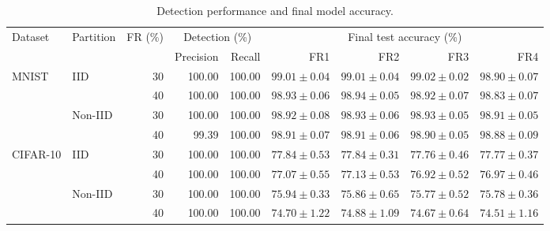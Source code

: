 \begin{table}[!t]
\centering\footnotesize\setlength{\tabcolsep}{3.5pt}
\caption{Detection performance and final model accuracy.}\label{tab:performance}
\begin{tabular}{llrrrrrrr}
\toprule
\multirow{2}{*}{Dataset} & \multirow{2}{*}{Partition} & \multirow{2}{*}{FR (\%)} & \multicolumn{2}{c}{Detection (\%)} & \multicolumn{4}{c}{Final test accuracy (\%)} \\
\cmidrule(lr){4-5}\cmidrule(lr){6-9}
& & & Precision & Recall & FR1 & FR2 & FR3 & FR4 \\
\midrule
\multirow{4}{*}{MNIST} & \multirow{2}{*}{IID} & 30 & 100.00 & 100.00 & $99.01 \pm 0.04$ & $99.01 \pm 0.04$ & $99.02 \pm 0.02$ & $98.90 \pm 0.07$ \\
 &  & 40 & 100.00 & 100.00 & $98.93 \pm 0.06$ & $98.94 \pm 0.05$ & $98.92 \pm 0.07$ & $98.83 \pm 0.07$ \\
\cmidrule(lr){2-9}
 & \multirow{2}{*}{Non-IID} & 30 & 100.00 & 100.00 & $98.92 \pm 0.08$ & $98.93 \pm 0.06$ & $98.93 \pm 0.05$ & $98.91 \pm 0.05$ \\
 &  & 40 & 99.39 & 100.00 & $98.91 \pm 0.07$ & $98.91 \pm 0.06$ & $98.90 \pm 0.05$ & $98.88 \pm 0.09$ \\
\midrule
\multirow{4}{*}{CIFAR-10} & \multirow{2}{*}{IID} & 30 & 100.00 & 100.00 & $77.84 \pm 0.53$ & $77.84 \pm 0.31$ & $77.76 \pm 0.46$ & $77.77 \pm 0.37$ \\
 &  & 40 & 100.00 & 100.00 & $77.07 \pm 0.55$ & $77.13 \pm 0.53$ & $76.92 \pm 0.52$ & $76.97 \pm 0.46$ \\
\cmidrule(lr){2-9}
 & \multirow{2}{*}{Non-IID} & 30 & 100.00 & 100.00 & $75.94 \pm 0.33$ & $75.86 \pm 0.65$ & $75.77 \pm 0.52$ & $75.78 \pm 0.36$ \\
 &  & 40 & 100.00 & 100.00 & $74.70 \pm 1.22$ & $74.88 \pm 1.09$ & $74.67 \pm 0.64$ & $74.51 \pm 1.16$ \\
\bottomrule
\end{tabular}
\end{table}
